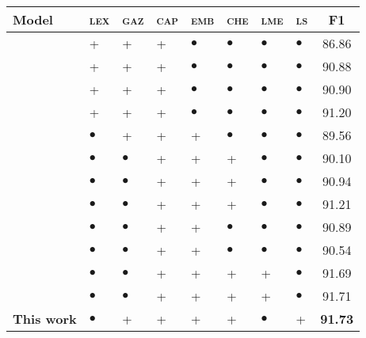 \documentclass[11pt]{article}
\newcommand{\lll}{\textsc{lex}}
\newcommand{\ggg}{\textsc{gaz}}
\newcommand{\ccc}{\textsc{cap}}
\newcommand{\chhh}{\textsc{che}}
\newcommand{\eee}{\textsc{emb}}
\newcommand{\mmm}{\textsc{lme}}
\newcommand{\sss}{\textsc{ls}}
\begin{document}
	\begin{table}[!h]
		\begin{center}
\setlength{\tabcolsep}{1mm}  
			\begin{tabular}{|l|lllllll|c|}
				\hline \textbf{Model} & \lll & \ggg & \ccc &\eee & \chhh & \mmm & \sss  & \textbf{F1} \\ 
				\hline
\cite{finkel2005incorporating} 		& \textsc{+}& \textsc{+}& \textsc{+} & $\bullet$&$\bullet$&$\bullet$& $\bullet$	& 86.86 \\
				\cite{ratinov2009design} 			& \textsc{+}& \textsc{+}& \textsc{+} & $\bullet$&$\bullet$&$\bullet$&$\bullet$	& 90.88 \\
				\cite{lin2009phrase} 				& \textsc{+}& \textsc{+}& \textsc{+} & $\bullet$&$\bullet$&$\bullet$&$\bullet$	& 90.90\\
				\cite{luo-2015} &\textsc{+}& \textsc{+}& \textsc{+} & $\bullet$&$\bullet$&$\bullet$&$\bullet$	& 91.20 \\
				
				\hline
				\cite{collobert2011natural} 		& $\bullet$ & \textsc{+}& \textsc{+}& \textsc{+} &$\bullet$&$\bullet$&$\bullet$	& 89.56\\
				\cite{huang2015bidirectional} 		& $\bullet$&$\bullet$ & \textsc{+}& \textsc{+}& \textsc{+} & $\bullet$ & $\bullet$	& 90.10\\
				\cite{lample2016neural} 			& $\bullet$&$\bullet$ & \textsc{+}& \textsc{+}& \textsc{+} & $\bullet$ & $\bullet$	& 90.94 \\
				\cite{ma2016end} 				& $\bullet$&$\bullet$ & \textsc{+}& \textsc{+}& \textsc{+} & $\bullet$ & $\bullet$	& 91.21\\	 
				\cite{shen2017deep} 			& $\bullet$&$\bullet$ & \textsc{+}& \textsc{+} & $\bullet$ & $\bullet$ & $\bullet$	& 90.89 \\
\cite{strubell2017fast} 			& $\bullet$&$\bullet$ & \textsc{+}& \textsc{+} & $\bullet$ & $\bullet$ & $\bullet$	& 90.54 \\				
				\cite{tran2017named}  			& $\bullet$&$\bullet$ & \textsc{+}& \textsc{+} & \textsc{+}& \textsc{+} & $\bullet$ 	& 91.69 \\
				\cite{liu2017empower} 			& $\bullet$&$\bullet$ & \textsc{+}& \textsc{+} & \textsc{+}& \textsc{+} & $\bullet$ 	&  91.71 \\
				\hline					
				\textbf{This work} 				& $\bullet$& \textsc{+}& \textsc{+} & \textsc{+}& \textsc{+} & $\bullet$ 	& \textsc{+}	& \bf 91.73 \\
				\hline
				

\end{tabular}
\end{center}
\end{table}
\end{document}
